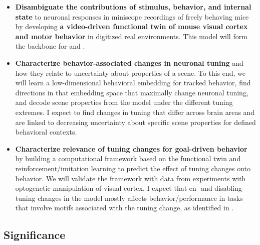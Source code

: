 \documentclass[B2,COG]{ercgrant}
\begin{document}
\begin{itemize}[leftmargin=2em,topsep=0pt,itemsep=0.62ex,partopsep=0ex,parsep=0.5ex,rightmargin=1ex]
    \item[\obj{1}] \textbf{Disambiguate the contributions of stimulus, behavior, and internal state} to neuronal responses in miniscope recordings of freely behaving mice  by developing \textbf{a video-driven functional twin of mouse visual cortex and motor behavior} in digitized real environments. This model will form the backbone for  and . 
    \item[\obj{2}] \textbf{Characterize behavior-associated changes in neuronal tuning} and how they relate to
    uncertainty about properties of a scene. To this end, we will learn a low-dimensional behavioral embedding for tracked behavior, find directions in that embedding space that maximally change neuronal tuning, and decode scene properties from the model under the different tuning extremes. I expect to find changes in tuning that differ across brain areas and are linked to decreasing  uncertainty about specific scene properties for defined behavioral contexts. 
    \item[\obj{3}] \textbf{Characterize relevance of tuning changes for goal-driven behavior} by building a computational framework based on the functional twin and reinforcement/imitation learning to predict the effect of tuning changes onto behavior. We will validate the framework with data from experiments with optogenetic manipulation of visual cortex. I expect that en- and disabling tuning changes in the model mostly affects behavior/performance in tasks that involve motifs associated with the tuning change, as identified in .
\end{itemize}

\subsection{Significance}
\end{document}
